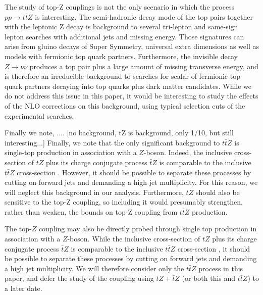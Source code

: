 \documentclass[preprint]{JHEP3} %
\def\ttbZ{t\bar{t}Z}
\begin{document}

The study of top-Z couplings is not the only scenario in which the process $pp\to\ttbZ$ is interesting. 
The semi-hadronic decay mode of the top pairs together with the leptonic Z decay is background to several tri-lepton and same-sign lepton searches with additional jets and missing energy.
Those signatures can arise from gluino decays of Super Symmetry, universal extra dimensions as well as models with fermionic top quark partners. 
Furthermore, the invisible decay $Z \to \nu \bar{\nu}$ produces a top pair plus a large amount of missing transverse energy, and is therefore an irreducible background to searches for 
scalar of fermionic top quark partners decaying into top quarks plus dark matter candidates.
While we do not address this issue in this paper, it would be interesting to study the effects of the NLO corrections on this background, using typical selection  cuts of the experimental searches.

Finally we note, .... [no background, tZ is background, only 1/10, but still interesting...]
Finally, we note that the only significant background to $\ttbZ$ is single-top production in association with a $Z$-boson. Indeed, the inclusive cross-section of $tZ$ plus its charge conjugate process $\bar{t}Z$ is comparable to the inclusive $\ttbZ$ cross-section \cite{Campbell:2013yla}. However, it should be possible to separate these processes by cutting on forward jets and demanding a high jet multiplicity. For this reason, we will neglect this background in our analysis. Furthermore, $tZ$ should also be sensitive to the top-Z coupling, so including it would presumably strengthen, rather than weaken, the bounds on top-Z coupling from $\ttbZ$ production. 

The top-$Z$ coupling may also be directly probed through single top production in association with a $Z$-boson. While the inclusive cross-section of $tZ$ plus its charge conjugate process $\bar{t}Z$ is comparable to the inclusive $\ttbZ$ cross-section \cite{Campbell:2013yla}, it should be possible to separate these processes by cutting on forward jets and demanding a high jet multiplicity. We will therefore consider only the $\ttbZ$ process in this paper, and defer the study of the coupling using $tZ+\bar{t}Z$ (or both this and $\ttbZ$) to a later date.
\end{document}
